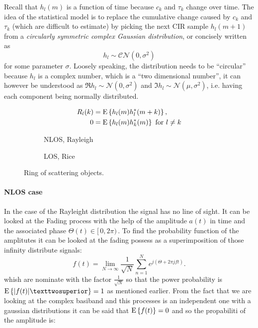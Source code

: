 Recall that \(h_l(m)\) is a function of time because \(c_k\) and \(\tau_k\) change over time. The idea of the statistical model is to replace the cumulative change caused by \(c_k\) and \(\tau_k\) (which are difficult to estimate) by picking the next CIR sample \(h_l(m +1)\) from a \emph{circularly symmetric complex Gaussian distribution}, or concisely written as
\begin{equation}
	h_l \sim \mathcal{CN}(0, \sigma^2)
\end{equation} 
for some parameter \(\sigma\). Loosely speaking, the distribution needs to be ``circular'' because \(h_l\) is a complex number, which is a ``two dimensional number'', it can however be understood as \(\Re{h_l} \sim \mathcal{N}(0, \sigma^2)\) and \(\Im{h_l} \sim \mathcal{N}(\mu, \sigma^2)\), i.e. having each component being normally distributed.


\begin{subequations}
	\begin{align}
		R_{l} (k) &= \operatorname{E} \left\{h_l(m) h_l^*(m+k)\right\}, \\
		0 &= \operatorname{E} \left\{h_l(m) h_k^*(m)\right\} \text { for } l \neq k
	\end{align}
\end{subequations}

\begin{figure}
	\centering
	\begin{subfigure}{.45\linewidth}
		\skelfig
		\caption{NLOS, Rayleigh}
	\end{subfigure}
	\hskip 5mm
	\begin{subfigure}{.45\linewidth}
		\skelfig 
		\caption{LOS, Rice}
	\end{subfigure}
	\caption{
		Ring of scattering objects.
		\label{fig:multipath-statistical-models}
	}
\end{figure}

\paragraph{NLOS case}

 In the case of the Rayleight distribution the signal has no line of sight. It can be looked at the Fading process \cite{Hoher2013} with the help of the amplitude \(a(t)\) in time and the associated phase \(\Theta(t) \in[\,0,2\pi)\,\). To find the probability function of the amplitutes it can be looked at the fading possess as a superimposition of those infinity distribute signals:
\begin{equation} \label{eqn:rayleight fading}
 	f(t) = \lim_{N\rightarrow\infty} \frac{1}{\sqrt{N}}\sum_{n=1}^{N} e^{j(\Theta +2\pi jf t)}.
 \end{equation}  
whish are nominate with the factor \(\frac{1}{\sqrt{N}}\) so that the power probability is \(\E{|f(t)|²}=1\) as mentioned earlier. From the fact that we are looking at the complex basiband and this processes is an independent one with a gaussian distributions it can be said that \(\operatorname{E} \left\{f(t)\right\}=0\) and so the propabiliti of the amplitude is:
 
